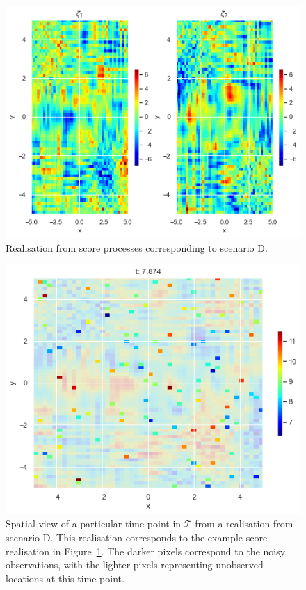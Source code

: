 \begin{figure}
	\centering
	\includegraphics[width=\textwidth]{sim_ex_zeta_D}
	\caption{Realisation from score processes corresponding to scenario D.}
	\label{fig:sim_ex_zeta_D}
\end{figure}

\begin{figure}
	\centering
	\includegraphics[width=\textwidth]{sim_example_D}
	\caption{Spatial view of a particular time point in $\mathcal{T}$ from a realisation from scenario D. This realisation corresponds to the example score realisation in Figure~\ref{fig:sim_ex_zeta_D}. The darker pixels correspond to the noisy observations, with the lighter pixels representing unobserved locations at this time point.}
	\label{fig:sim_example_D}
\end{figure}

